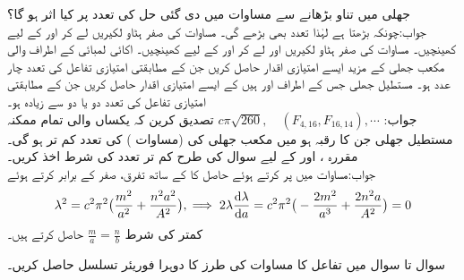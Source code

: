 \quad
جھلی میں تناو بڑھانے سے مساوات  میں دی گئی حل کی تعدد پر کیا اثر ہو گا؟\\
جواب:\quad چونکہ  بڑھتا ہے لہٰذا تعدد بھی بڑھے گی۔
\quad
مساوات  کی صفر ہٹاو لکیریں  لے کر   اور  کے لیے کھینچیں۔ 
\quad
مساوات  کی صفر ہٹاو لکیریں  اور  لے کر   اور  کے لیے کھینچیں۔ 
\quad
اکائی لمبائی کے اطراف والی مکعب جھلی کے مزید ایسے امتیازی اقدار حاصل کریں جن کے مطابقتی امتیازی تفاعل کی تعدد چار عدد ہو۔
\quad
مستطیل جھلی جس کے اطراف  اور  ہیں کے ایسے امتیازی اقدار حاصل کریں جن کے مطابقتی امتیازی تفاعل کی تعدد دو یا دو سے زیادہ ہو۔\\
جواب:\quad
$c\pi\sqrt{260}, \quad (F_{4,16},F_{16,14}),\cdots $
\quad
تصدیق کرین کہ یکساں  والی تمام ممکنہ مستطیل جھلی جن کا رقبہ  ہو میں مکعب جھلی  کی  (مساوات ) کی تعدد کم تر ہو گی۔
\quad
مقررہ ،  اور  کے لیے  سوال  کی طرح کم تر تعدد کی شرط اخذ کریں۔\\
جواب:\quad مساوات  میں  پر کرتے ہوئے حاصل  کا  کے ساتھ تفرق، صفر کے برابر کرتے ہوئے
\begin{align*}
\lambda^2=c^2\pi^2\big(\frac{m^2}{a^2}+\frac{n^2a^2}{A^2}\big),\implies 2\lambda \frac{\dif \lambda}{\dif a}=c^2\pi^2\big(-\frac{2m^2}{a^3}+\frac{2n^2a}{A^2}\big)=0
\end{align*}
 کمتر  کی شرط 
$\tfrac{m}{a}=\tfrac{n}{b}$
حاصل کرتے ہیں۔

سوال  تا سوال  میں تفاعل  کا مساوات  کی طرز کا دوہرا فوریئر تسلسل حاصل کریں۔

